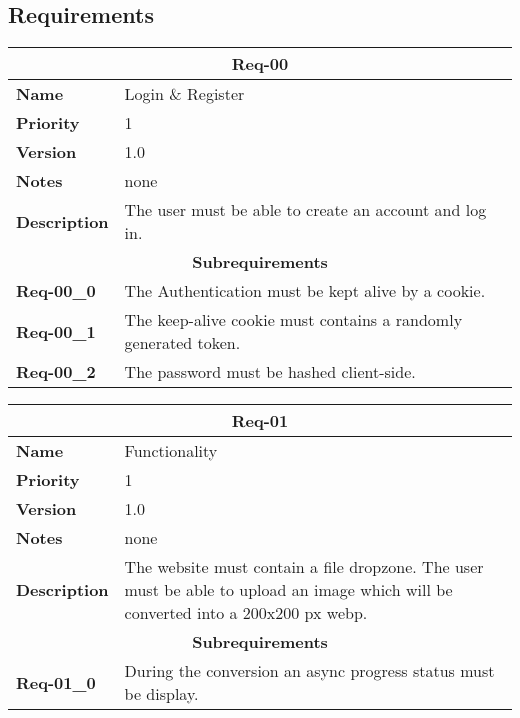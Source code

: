 \documentclass[../documentation.tex]{subfiles}
\begin{document}
\subsection{Requirements}

\bgroup{}
\def\arraystretch{1.25}
\begin{center}
    \begin{tabular}{ |l|p{9cm}| }
        \hline
        \multicolumn{2}{|c|}{\textbf{Req-00}} \\
        \hline
        \textbf{Name} & Login \& Register \\
        \hline
        \textbf{Priority} & 1 \\
        \hline
        \textbf{Version} & 1.0 \\
        \hline
        \textbf{Notes} & none \\
        \hline
        \textbf{Description} & The user must be able to create an account and log in. \\
        \hline
        \multicolumn{2}{|c|}{\textbf{Subrequirements}} \\
        \hline
        \textbf{Req-00\_0} & The Authentication must be kept alive by a cookie. \\
        \textbf{Req-00\_1} & The keep-alive cookie must contains a randomly generated token. \\
        \textbf{Req-00\_2} & The password must be hashed client-side. \\
        \hline
    \end{tabular}
\end{center}
\egroup{}

\bgroup{}
\def\arraystretch{1.25}
\begin{center}
    \begin{tabular}{ |l|p{9cm}| }
        \hline
        \multicolumn{2}{|c|}{\textbf{Req-01}} \\
        \hline
        \textbf{Name} & Functionality \\
        \hline
        \textbf{Priority} & 1 \\
        \hline
        \textbf{Version} & 1.0 \\
        \hline
        \textbf{Notes} & none \\
        \hline
        \textbf{Description} & The website must contain a file dropzone. The user must be able to upload an image which will be converted into a 200x200 px webp. \\
        \hline
        \multicolumn{2}{|c|}{\textbf{Subrequirements}} \\
        \hline
        \textbf{Req-01\_0} & During the conversion an async progress status must be display. \\
        \hline
    \end{tabular}
\end{center}
\egroup{}
\end{document}
